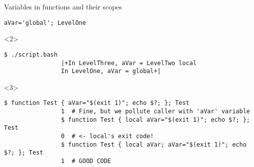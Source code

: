 \begin{frame}[fragile]{Variables in functions and their scopes}
\begin{overlayarea}{\textwidth}{0.7\textheight}
\begin{onlyenv}
\begin{lstlisting}[style=MyBash]
                aVar='global'; LevelOne
            \end{lstlisting}
        \end{onlyenv}
        \begin{onlyenv}<2>
            \begin{lstlisting}[style=MyBash]
                $ ./script.bash
                |+In LevelThree, aVar = LevelTwo local
                In LevelOne, aVar = global+|
            \end{lstlisting}
        \end{onlyenv}
        \begin{onlyenv}<3>
            \begin{lstlisting}[style=MyBash, style=oddnumbers, xleftmargin=1mm, xrightmargin=1mm]
                $ function Test { aVar="$(exit 1)"; echo $?; }; Test
                1  # Fine, but we pollute caller with 'aVar' variable
                $ function Test { local aVar="$(exit 1)"; echo $?; }; Test
                0  # <- local's exit code!
                $ function Test { local aVar; aVar="$(exit 1)"; echo $?; }; Test
                1  # GOOD CODE
            \end{lstlisting}
        \end{onlyenv}
    \end{overlayarea}
\end{frame}
